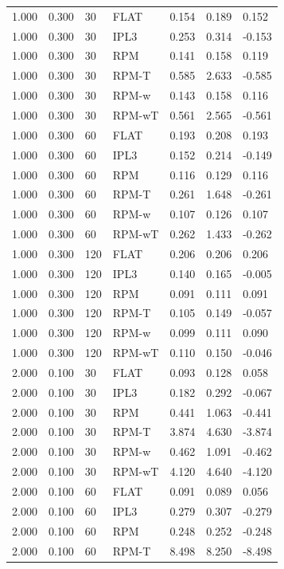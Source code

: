 \begin{tabular}{lllllll}
1.000 & 0.300 & 30 & FLAT & 0.154 & 0.189 & 0.152 \\
1.000 & 0.300 & 30 & IPL3 & 0.253 & 0.314 & -0.153 \\
1.000 & 0.300 & 30 & RPM & 0.141 & 0.158 & 0.119 \\
1.000 & 0.300 & 30 & RPM-T & 0.585 & 2.633 & -0.585 \\
1.000 & 0.300 & 30 & RPM-w & 0.143 & 0.158 & 0.116 \\
1.000 & 0.300 & 30 & RPM-wT & 0.561 & 2.565 & -0.561 \\
1.000 & 0.300 & 60 & FLAT & 0.193 & 0.208 & 0.193 \\
1.000 & 0.300 & 60 & IPL3 & 0.152 & 0.214 & -0.149 \\
1.000 & 0.300 & 60 & RPM & 0.116 & 0.129 & 0.116 \\
1.000 & 0.300 & 60 & RPM-T & 0.261 & 1.648 & -0.261 \\
1.000 & 0.300 & 60 & RPM-w & 0.107 & 0.126 & 0.107 \\
1.000 & 0.300 & 60 & RPM-wT & 0.262 & 1.433 & -0.262 \\
1.000 & 0.300 & 120 & FLAT & 0.206 & 0.206 & 0.206 \\
1.000 & 0.300 & 120 & IPL3 & 0.140 & 0.165 & -0.005 \\
1.000 & 0.300 & 120 & RPM & 0.091 & 0.111 & 0.091 \\
1.000 & 0.300 & 120 & RPM-T & 0.105 & 0.149 & -0.057 \\
1.000 & 0.300 & 120 & RPM-w & 0.099 & 0.111 & 0.090 \\
1.000 & 0.300 & 120 & RPM-wT & 0.110 & 0.150 & -0.046 \\
2.000 & 0.100 & 30 & FLAT & 0.093 & 0.128 & 0.058 \\
2.000 & 0.100 & 30 & IPL3 & 0.182 & 0.292 & -0.067 \\
2.000 & 0.100 & 30 & RPM & 0.441 & 1.063 & -0.441 \\
2.000 & 0.100 & 30 & RPM-T & 3.874 & 4.630 & -3.874 \\
2.000 & 0.100 & 30 & RPM-w & 0.462 & 1.091 & -0.462 \\
2.000 & 0.100 & 30 & RPM-wT & 4.120 & 4.640 & -4.120 \\
2.000 & 0.100 & 60 & FLAT & 0.091 & 0.089 & 0.056 \\
2.000 & 0.100 & 60 & IPL3 & 0.279 & 0.307 & -0.279 \\
2.000 & 0.100 & 60 & RPM & 0.248 & 0.252 & -0.248 \\
2.000 & 0.100 & 60 & RPM-T & 8.498 & 8.250 & -8.498 \\

\end{tabular}
